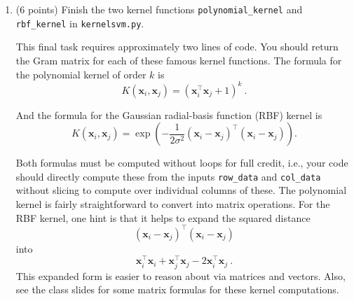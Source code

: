 \documentclass[10pt]{article}
\newcommand{\bx}{{\boldsymbol x}}
\begin{document}
\begin{enumerate}
\item (6 points) Finish the two kernel functions \texttt{polynomial\_kernel} and \texttt{rbf\_kernel} in \texttt{kernelsvm.py}.

This final task requires approximately two lines of code. You should return the Gram matrix for each of these famous kernel functions. The formula for the polynomial kernel of order $k$ is
\begin{equation}
K(\bx_i, \bx_j) = (\bx_i^\top \bx_j + 1)^k~.
\end{equation}

And the formula for the Gaussian radial-basis function (RBF) kernel is
\begin{equation}
K(\bx_i, \bx_j) = \exp\left(- \frac{1}{2 \sigma^2} (\bx_i - \bx_j) ^\top (\bx_i - \bx_j)\right).
\end{equation}

Both formulas must be computed without loops for full credit, i.e., your code should directly compute these from the inputs \texttt{row\_data} and \texttt{col\_data} without slicing to compute over individual columns of these. The polynomial kernel is fairly straightforward to convert into matrix operations. For the RBF kernel, one hint is that it helps to expand the squared distance 
\[
(\bx_i - \bx_j) ^\top (\bx_i - \bx_j)
\]
into
\[
\bx_i^\top \bx_i + \bx_j^\top \bx_j - 2 \bx_i^\top \bx_j~.
\]
This expanded form is easier to reason about via matrices and vectors. Also, see the class slides for some matrix formulas for these kernel computations.

\end{enumerate}
\end{document}
